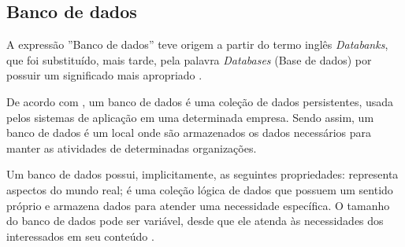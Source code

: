 \subsection{Banco de dados}

\par A expressão ''Banco de dados'' teve origem a partir do termo inglês \textit{Databanks}, que foi substituído, mais tarde, pela palavra \textit{Databases} (Base de dados)  por possuir um significado mais apropriado \cite {setzer_silva_banco_dados_aprenda_o_que_sao_melhore_conhecimento}.

\par De acordo com , um banco de dados é uma coleção de dados persistentes, usada pelos sistemas de aplicação em uma determinada empresa. Sendo assim, um banco de dados é um local onde são armazenados os dados necessários para manter as atividades de determinadas organizações.

\par Um banco de dados possui, implicitamente, as seguintes propriedades: representa aspectos do mundo real; é uma coleção lógica de dados que possuem um sentido próprio e armazena dados para atender uma necessidade específica. O tamanho do banco de dados pode ser variável, desde que ele atenda às necessidades dos interessados em seu conteúdo \cite{elmasri_navathe_sistemas_banco_dados}.